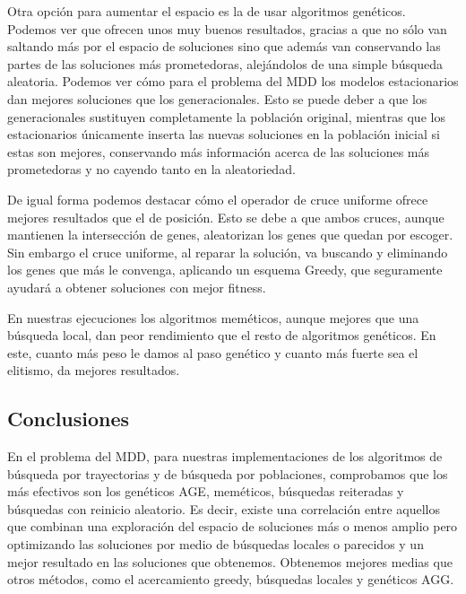 Otra opción para aumentar el espacio es la de usar algoritmos genéticos. Podemos ver que ofrecen unos muy buenos resultados, gracias a que no sólo van saltando más por el espacio de soluciones
sino que además van conservando las partes de las soluciones más prometedoras, alejándolos de una simple búsqueda aleatoria. Podemos ver cómo para el problema del MDD los modelos
estacionarios dan mejores soluciones que los generacionales. Esto se puede deber a que los generacionales sustituyen completamente la población original, mientras que los estacionarios
únicamente inserta las nuevas soluciones en la población inicial si estas son mejores, conservando más información acerca de las soluciones más prometedoras y no cayendo tanto en la aleatoriedad.

De igual forma podemos destacar cómo el operador de cruce uniforme ofrece mejores resultados que el de posición. Esto se debe a que ambos cruces, aunque mantienen la intersección de genes,
aleatorizan los genes que quedan por escoger. Sin embargo el cruce uniforme, al reparar la solución, va buscando y eliminando los genes que más le convenga, aplicando un esquema Greedy, que
seguramente ayudará a obtener soluciones con mejor fitness.

En nuestras ejecuciones los algoritmos meméticos, aunque mejores que una búsqueda local, dan peor rendimiento que el resto de algoritmos genéticos.
En este, cuanto más peso le damos al paso genético y cuanto más fuerte sea el elitismo, da mejores resultados.

\subsection{Conclusiones}

En el problema del MDD, para nuestras implementaciones de los algoritmos de búsqueda por trayectorias y de búsqueda por
poblaciones, comprobamos que los más efectivos son los genéticos AGE, meméticos, búsquedas reiteradas y búsquedas con
reinicio aleatorio. Es decir, existe una correlación entre aquellos que combinan una exploración del espacio de soluciones
más o menos amplio pero optimizando las soluciones por medio de búsquedas locales o parecidos y un mejor resultado en las
soluciones que obtenemos. Obtenemos mejores medias que otros métodos, como el acercamiento greedy, búsquedas locales y genéticos AGG.














